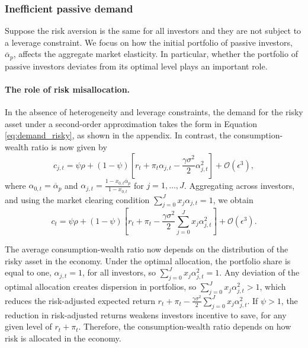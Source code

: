 \subsubsection{Inefficient passive demand}

Suppose the risk aversion is the same for all investors and they are not subject to a leverage constraint. We focus on how the initial portfolio of passive investors, $\overline{\alpha}_p$, affects the aggregate market elasticity. 
In particular, whether the portfolio of passive investors deviates from its optimal level plays an important role.


\paragraph{The role of risk misallocation.} In the absence of heterogeneity and leverage constraints, the demand for the risky asset under a second-order approximation takes the form in Equation \eqref{eq:demand_risky}, as shown in the appendix. In contrast, the consumption-wealth ratio is now given by
\begin{equation}
    c_{j,t} = \psi \rho + (1-\psi) \left[ r_t + \pi_t \alpha_{j,t} - \frac{\gamma \sigma^2}{2} \alpha_{j,t}^2 \right] + \mathcal{O}(\epsilon^3),
\end{equation}
where $\alpha_{0,t} = \overline{\alpha}_p $ and $\alpha_{j,t} = \frac{1-x_{0,t} \overline{\alpha}_p}{1-x_{0,t}}$ for $j = 1,\ldots, J$. Aggregating across investors, and using the market clearing condition $\sum_{j=0}^J x_j \alpha_{j,t} = 1$, we obtain
\begin{equation}
    c_t = \psi \rho + (1-\psi) \left[ r_t + \pi_t - \frac{\gamma \sigma^2}{2} \sum_{j=0}^J x_j \alpha_{j,t}^2 \right] + \mathcal{O}(\epsilon^3).
\end{equation}

The average consumption-wealth ratio now depends on the distribution of the risky asset in the economy. 
Under the optimal allocation, the portfolio share is equal to one, $\alpha_{j,t} =1 $, for all investors, so $\sum_{j=0}^J x_j \alpha_{j,t}^2 = 1$. Any deviation of the optimal allocation creates dispersion in portfolios, so 
$\sum_{j=0}^J x_j \alpha_{j,t}^2 > 1$, which reduces the risk-adjusted expected return $r_t + \pi_t - \frac{\gamma \sigma^2}{2} \sum_{j=0}^J x_j \alpha_{j,t}^2$. 
If $\psi > 1$, the reduction in risk-adjusted returns weakens investors incentive to save, for any given level of $r_t +\pi_t$. 
Therefore, the consumption-wealth ratio depends on how risk is allocated in the economy. 

